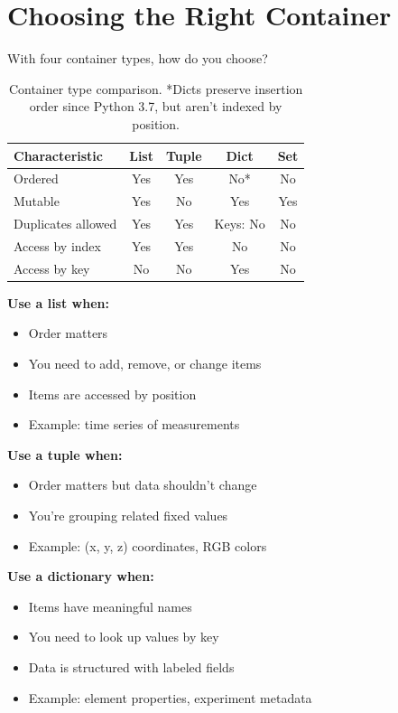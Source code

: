 \section{Choosing the Right Container}
\label{sec:choosing-container}

With four container types, how do you choose?

\begin{table}[h]
\centering
\begin{tabular}{lcccc}
\toprule
Characteristic & List & Tuple & Dict & Set \\
\midrule
Ordered & Yes & Yes & No* & No \\
Mutable & Yes & No & Yes & Yes \\
Duplicates allowed & Yes & Yes & Keys: No & No \\
Access by index & Yes & Yes & No & No \\
Access by key & No & No & Yes & No \\
\bottomrule
\end{tabular}
\caption{Container type comparison. *Dicts preserve insertion order since Python 3.7, but aren't indexed by position.}
\label{tab:container-comparison}
\end{table}

\textbf{Use a list when:}
\begin{itemize}
    \item Order matters
    \item You need to add, remove, or change items
    \item Items are accessed by position
    \item Example: time series of measurements
\end{itemize}

\textbf{Use a tuple when:}
\begin{itemize}
    \item Order matters but data shouldn't change
    \item You're grouping related fixed values
    \item Example: (x, y, z) coordinates, RGB colors
\end{itemize}

\textbf{Use a dictionary when:}
\begin{itemize}
    \item Items have meaningful names
    \item You need to look up values by key
    \item Data is structured with labeled fields
    \item Example: element properties, experiment metadata
\end{itemize}

